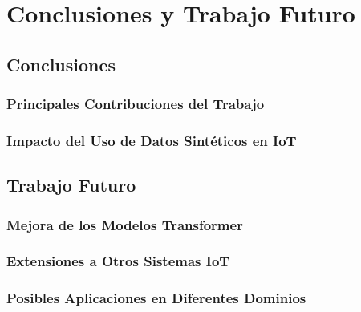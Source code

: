 \chapter{Conclusiones y Trabajo Futuro}

\section{Conclusiones}
\subsection{Principales Contribuciones del Trabajo}
\subsection{Impacto del Uso de Datos Sintéticos en IoT}

\section{Trabajo Futuro}
\subsection{Mejora de los Modelos Transformer}
\subsection{Extensiones a Otros Sistemas IoT}
\subsection{Posibles Aplicaciones en Diferentes Dominios}